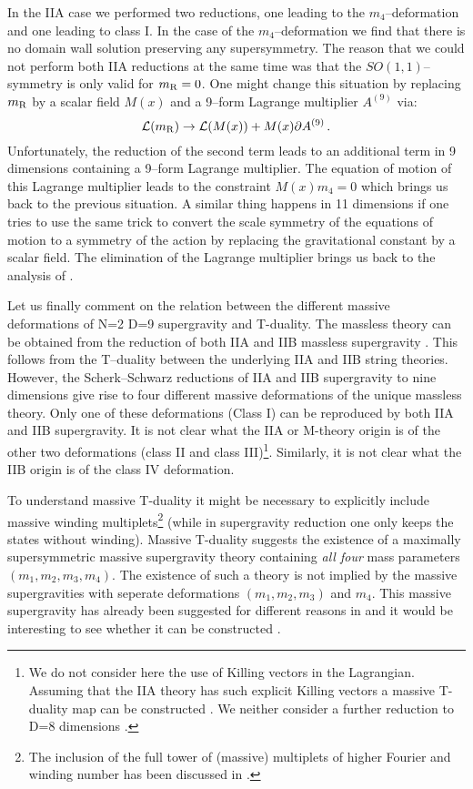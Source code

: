 \documentclass[12pt,a4paper]{article}
\begin{document}
In the IIA case we performed two reductions, one leading to the
$m_4$--deformation and one leading to class I. In the case of the
$m_4$--deformation we find that there is no domain wall solution
preserving any supersymmetry.
The reason that we could not
perform both IIA reductions at the same time was that the $SO(1,1)$--symmetry
is only valid for $m_{\rm R}=0$. One might change this situation
by replacing $m_{\rm R}$ by a scalar field $M(x)$ and a 9--form
Lagrange multiplier $A^{(9)}$ \cite{Bergshoeff:2001pv} via:
\begin{equation}
  \mathcal{L}(m_{\rm R}) \rightarrow \mathcal{L}(M(x)) + M(x)\partial A^{(9)}\, .
\end{equation}
Unfortunately, the reduction of the second term leads to an
additional term in 9 dimensions containing a 9--form Lagrange multiplier.
The equation of motion of this Lagrange multiplier leads to the
constraint $M(x)m_4 = 0$ which brings us back to the previous situation.
A similar thing happens in 11 dimensions if one tries to use
the same trick to convert the scale symmetry of the
equations of motion to a symmetry of the action by replacing the
gravitational constant by a scalar field. The elimination of the
Lagrange multiplier brings us back to the analysis of \cite{Howe:1998qt}.


Let us finally comment on the relation between the
different massive deformations of N=2 D=9
supergravity and T-duality. The massless theory can be obtained
from the reduction of both IIA and IIB massless supergravity
\cite{Bergshoeff:1995as}. This follows from the T--duality between the
underlying IIA and IIB string theories. However, the Scherk--Schwarz
reductions
of IIA and IIB supergravity to nine dimensions give rise to four different
massive
deformations of the unique massless theory.
Only one of these deformations (Class I)
can be reproduced by both IIA and IIB supergravity.
It is not clear what the IIA or M-theory origin is of the other
two deformations (class II and class III)\footnote{We do not consider here
the use of Killing vectors in the Lagrangian. Assuming that the IIA theory
has such explicit Killing vectors a massive T-duality map can be constructed
\cite{Meessen:1998qm}. We neither consider a further reduction to
D=8 dimensions \cite{Hull:1998vy}.}. Similarly, it is not clear what the
IIB origin is of the class IV deformation.

To understand massive T-duality it might be necessary to explicitly
include massive winding multiplets\footnote{The inclusion of the full
tower of (massive) multiplets of higher Fourier and winding number has
been discussed in
\cite{Abou-Zeid:1999fv,deWit:2000wu,deWit:2000zz}.}
(while in supergravity reduction
one only keeps the states without winding).
Massive T-duality suggests the existence of a maximally
supersymmetric
massive supergravity theory containing {\it all four} mass parameters
$(m_1, m_2, m_3, m_4)$. The existence of such a theory is not implied by the
massive supergravities with seperate deformations $(m_1,m_2,m_3)$ and $m_4$.
This massive supergravity has already been
suggested for
different reasons in \cite{Meessen:1998qm} and it would be interesting to
see whether it can be constructed \cite{Bergshoeff:2002}.
\end{document}
